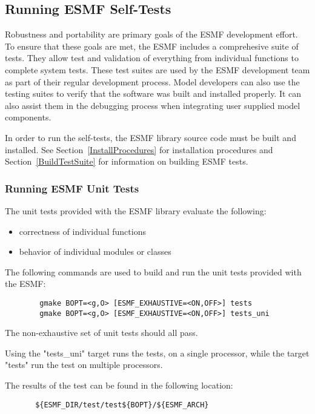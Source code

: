 
\subsection{Running ESMF Self-Tests}
\label{testing}

Robustness and portability are primary goals of the ESMF development effort. To ensure that these goals are met, the ESMF includes a comprehesive suite of tests. They allow test and validation of everything from individual functions to complete system tests. These test suites are used by the ESMF development team as part of their regular development process. Model developers can also use the testing suites to verify that the software was built and installed properly. It can also assist them in the debugging process when integrating user supplied model components. 

In order to run the self-tests, the ESMF library source code must be built and installed.  See 
Section~\ref{InstallProcedures} for installation procedures and Section~\ref{BuildTestSuite} for 
information on building ESMF tests.  

\subsubsection{Running ESMF Unit Tests}

\label{UnitTestDescription}
The unit tests provided with the ESMF library evaluate the following:
\begin{itemize}
\item correctness of individual functions
\item behavior of individual modules or classes
\end{itemize}

\label{RunUnitTests}

The following commands are used to build and run the unit tests provided with the ESMF:
\begin{verbatim}
        gmake BOPT=<g,O> [ESMF_EXHAUSTIVE=<ON,OFF>] tests
        gmake BOPT=<g,O> [ESMF_EXHAUSTIVE=<ON,OFF>] tests_uni
\end{verbatim}

The non-exhaustive set of unit tests should all pass.

Using the "tests_uni" target runs the tests, on a single processor, while
the target "tests" run the test on multiple processors.


The results of the test can be found in the following location:
\begin{verbatim}
       ${ESMF_DIR/test/test${BOPT}/${ESMF_ARCH}
\end{verbatim}

